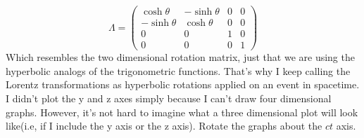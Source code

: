 \documentclass[12pt]{article}
\begin{document}
\[
\Lambda = \begin{pmatrix}
\cosh\theta & -\sinh\theta & 0 & 0\\
-\sinh\theta & \cosh\theta & 0 & 0\\
0 & 0 & 1 & 0\\
0 & 0 & 0 & 1
\end{pmatrix}
\]
Which resembles the two dimensional rotation matrix, just that we are using the hyperbolic analogs of the trigonometric functions.
That's why I keep calling the Lorentz transformations as hyperbolic rotations applied on an event in spacetime.
I didn't plot the y and z axes simply because I can't draw four dimensional graphs. However, it's not hard to imagine what a three dimensional plot 
will look like(i.e, if I include the y axis or the z axis). Rotate the graphs about the $ct$ axis. 
\end{document}
